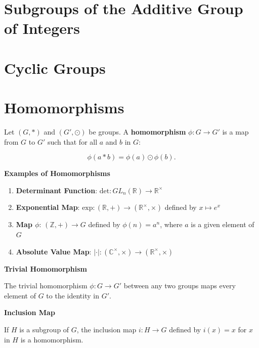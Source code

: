 \documentclass[
]{book}
\providecommand{\tightlist}{%
  \setlength{\itemsep}{0pt}\setlength{\parskip}{0pt}}
\begin{document}
\hypertarget{subgroups-of-the-additive-group-of-integers}{%
\section{Subgroups of the Additive Group of
Integers}\label{subgroups-of-the-additive-group-of-integers}}

\hypertarget{cyclic-groups}{%
\section{Cyclic Groups}\label{cyclic-groups}}

\hypertarget{homomorphisms}{%
\section{Homomorphisms}\label{homomorphisms}}

\leavevmode{}%
Let \((G, *)\) and \((G', \odot)\) be groups. A \textbf{homomorphism}
\(\phi: G \rightarrow G'\) is a map from \(G\) to \(G'\) such that for
all \(a\) and \(b\) in \(G\):

\begin{equation}
    \phi(a * b) = \phi(a) \odot \phi(b).
\end{equation}

\textbf{Examples of Homomorphisms}

\begin{enumerate}
\def\labelenumi{\arabic{enumi}.}
\tightlist
\item
  \textbf{Determinant Function}:
  \(\text{det}: GL_n(\mathbb{R}) \to \mathbb{R}^\times\)
\item
  \textbf{Exponential Map}:
  \(\text{exp}: (\mathbb{R}, +) \to (\mathbb{R}^\times, \times)\)
  defined by \(x \mapsto e^x\)
\item
  \textbf{Map \(\phi\)}: \((\mathbb{Z}, +) \to G\) defined by
  \(\phi(n) = a^n\), where \(a\) is a given element of \(G\)
\item
  \textbf{Absolute Value Map}:
  \(|\cdot| : (\mathbb{C}^\times, \times) \to (\mathbb{R}^\times, \times)\)
\end{enumerate}

\textbf{Trivial Homomorphism}

The trivial homomorphism \(\phi: G \rightarrow G'\) between any two
groups maps every element of \(G\) to the identity in \(G'\).

\textbf{Inclusion Map}

If \(H\) is a subgroup of \(G\), the inclusion map
\(i: H \rightarrow G\) defined by \(i(x) = x\) for \(x\) in \(H\) is a
homomorphism.
\end{document}
